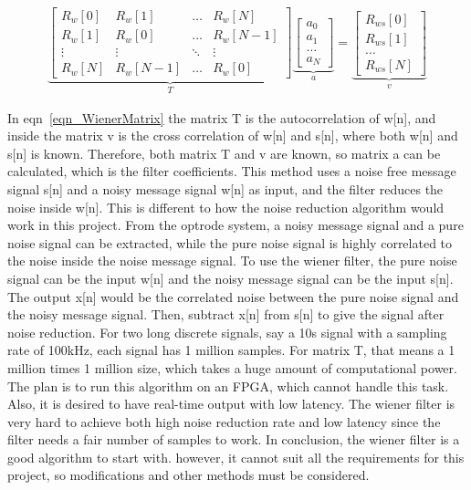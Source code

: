 \begin{gather} \label{eqn_WienerMatrix}
\underbrace{
    \begin{bmatrix}
    R_w[0] & R_w[1] & \dots & R_w[N] \\
    R_w[1] & R_w[0] & \dots & R_w[N-1] \\
    \vdots & \vdots & \ddots & \vdots \\
    R_w[N] & R_w[N-1] & \dots & R_w[0]
    \end{bmatrix}
}_{T}
\underbrace{
    \begin{bmatrix}
    a_0 \\
    a_1 \\
    \dots \\
    a_N
    \end{bmatrix}
}_{a}
=
\underbrace{
    \begin{bmatrix}
    R_{ws}[0] \\
    R_{ws}[1] \\
    \dots \\
    R_{ws}[N]
    \end{bmatrix}
}_{v}
\end{gather}

In eqn~\ref{eqn_WienerMatrix} the matrix T is the autocorrelation of w[n], and inside the matrix v is the cross correlation of w[n] and s[n], where both w[n] and s[n] is known.  Therefore, both matrix T and v are known, so matrix a can be calculated, which is the filter coefficients.
This method uses a noise free message signal s[n] and a noisy message signal w[n] as input, and the filter reduces the noise inside w[n].  This is different to how the noise reduction algorithm would work in this project.  From the optrode system, a noisy message signal and a pure noise signal can be extracted, while the pure noise signal is highly correlated to the noise inside the noise message signal.  To use the wiener filter, the pure noise signal can be the input w[n] and the noisy message signal can be the input s[n].  The output x[n] would be the correlated noise between the pure noise signal and the noisy message signal.  Then, subtract x[n] from s[n] to give the signal after noise reduction.
For two long discrete signals, say a 10s signal with a sampling rate of 100kHz, each signal has 1 million samples.  For matrix T, that means a 1 million times 1 million size, which takes a huge amount of computational power.  The plan is to run this algorithm on an FPGA, which cannot handle this task.  Also, it is desired to have real-time output with low latency.  The wiener filter is very hard to achieve both high noise reduction rate and low latency since the filter needs a fair number of samples to work.
In conclusion, the wiener filter is a good algorithm to start with.  however, it cannot suit all the requirements for this project, so modifications and other methods must be considered.

